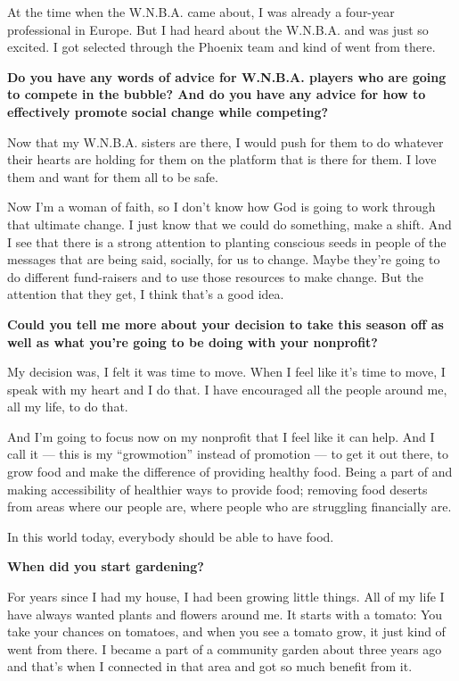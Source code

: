 At the time when the W.N.B.A. came about, I was already a four-year
professional in Europe. But I had heard about the W.N.B.A. and was just
so excited. I got selected through the Phoenix team and kind of went
from there.

\textbf{Do you have any words of advice for W.N.B.A. players who are
going to compete in the bubble? And do you have any advice for how to
effectively promote social change while competing?}

Now that my W.N.B.A. sisters are there, I would push for them to do
whatever their hearts are holding for them on the platform that is there
for them. I love them and want for them all to be safe.

Now I'm a woman of faith, so I don't know how God is going to work
through that ultimate change. I just know that we could do something,
make a shift. And I see that there is a strong attention to planting
conscious seeds in people of the messages that are being said, socially,
for us to change. Maybe they're going to do different fund-raisers and
to use those resources to make change. But the attention that they get,
I think that's a good idea.

\textbf{Could you tell me more about your decision to take this season
off as well as what you're going to be doing with your nonprofit?}

My decision was, I felt it was time to move. When I feel like it's time
to move, I speak with my heart and I do that. I have encouraged all the
people around me, all my life, to do that.

And I'm going to focus now on my nonprofit that I feel like it can help.
And I call it --- this is my ``growmotion'' instead of promotion --- to
get it out there, to grow food and make the difference of providing
healthy food. Being a part of and making accessibility of healthier ways
to provide food; removing food deserts from areas where our people are,
where people who are struggling financially are.

In this world today, everybody should be able to have food.

\textbf{When did you start gardening?}

For years since I had my house, I had been growing little things. All of
my life I have always wanted plants and flowers around me. It starts
with a tomato: You take your chances on tomatoes, and when you see a
tomato grow, it just kind of went from there. I became a part of a
community garden about three years ago and that's when I connected in
that area and got so much benefit from it.

